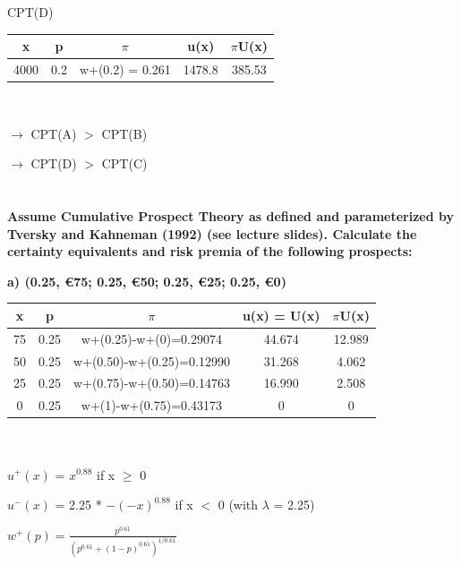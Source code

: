 \documentclass{article}
\begin{document}
CPT(D)

\begin{tabular}{|c|c|c|c|c|}
	\hline
	x    & p & $\pi$             & u(x) & $\pi$U(x) \\  \hline
	4000 & 0.2 & w+(0.2) = 0.261 & 1478.8  &  385.53 \\
	\hline
\end{tabular} \\

\vspace{1mm}

$\rightarrow$ CPT(A) $>$ CPT(B)  

 $\rightarrow$  CPT(D) $>$ CPT(C)

\section{}
 \textbf{Assume Cumulative Prospect Theory as defined and parameterized by Tversky and Kahneman (1992) (see lecture slides). Calculate the certainty equivalents and risk premia of the following prospects: } 
  
  \vspace{2mm}
  
\textbf{ a) (0.25, €75; 0.25, €50; 0.25, €25; 0.25, €0)} 

\vspace{2mm}

	\begin{tabular}{|c|c|c|c|c|}
		\hline
		x  & p    & $\pi$                         & u(x) = U(x) & $\pi$U(x)  \\ \hline
		75 & 0.25 & w+(0.25)-w+(0)=0.29074    & 44.674      & 12.989 \\ \hline
		50 & 0.25 & w+(0.50)-w+(0.25)=0.12990 & 31.268      & 4.062  \\ \hline
		25 & 0.25 & w+(0.75)-w+(0.50)=0.14763 & 16.990      & 2.508  \\ \hline
		0  & 0.25 & w+(1)-w+(0.75)=0.43173    & 0           & 0      \\ \hline
	\end{tabular} \\ \\



$u^+(x)$ = $x^{0.88}$ if x $\geq$ 0

$u^-(x)$ = 2.25 * $-(-x)^{0.88}$ if x $<$ 0     (with $\lambda$ = 2.25) \\

\Large

$w^+(p) = \frac{p^{0.61}}{(p^{0.61}+(1-p)^{0.61})^{1/0.61}}$
\end{document}

